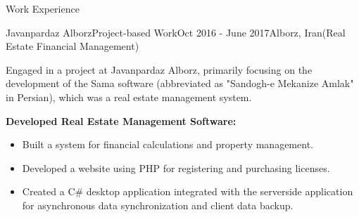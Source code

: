 \documentclass[]{kyvernitis-resume}
\begin{document}
\begin{section}{Work Experience}
    \begin{subsection}{Javanpardaz Alborz}{Project-based Work}{Oct 2016 - June 2017}{Alborz, Iran}{(Real Estate Financial Management)}
	\item Engaged in a project at Javanpardaz Alborz, primarily focusing on the development of the Sama software (abbreviated as "Sandogh-e Mekanize Amlak" in Persian), which was a real estate management system.
	\item \textbf{ Developed Real Estate Management Software: }
	\begin{itemize}
	\item Built a system for financial calculations and property management.
	\item Developed a website using PHP for registering and purchasing licenses.
	\item Created a C\# desktop application integrated with the serverside application for asynchronous data synchronization and client data backup.
	\end{itemize}
    \end{subsection}



\end{section}
\end{document}
